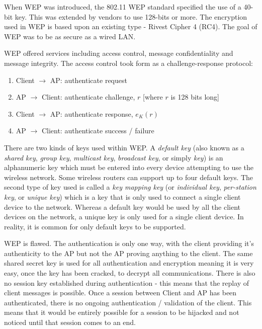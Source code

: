 When WEP was introduced, the 802.11 WEP standard specified the use of a 40-bit key. This was extended by vendors to use 128-bits or more. The encryption used in WEP is based upon an existing type - Rivest Cipher 4 (RC4). The goal of WEP was to be as secure as a wired LAN. 

WEP offered services including access control, message confidentiality and message integrity. The access control took form as a challenge-response protocol:
\begin{enumerate}
    \item Client $\rightarrow$ AP: authenticate request
    \item AP $\rightarrow$ Client: authenticate challenge, $r$ [where $r$ is 128 bits long]
    \item Client $\rightarrow$ AP: authenticate response, $e_K(r)$
    \item AP $\rightarrow$ Client: authenticate success / failure
\end{enumerate}

There are two kinds of keys used within WEP. A \textit{default key} (also known as a \textit{shared key}, \textit{group key}, \textit{multicast key}, \textit{broadcast key}, or simply \textit{key}) is an alphanumeric key which must be entered into every device attempting to use the wireless network. Some wireless routers can support up to four default keys. The second type of key used is called a \textit{key mapping key} (or \textit{individual key}, \textit{per-station key}, or \textit{unique key}) which is a key that is only used to connect a single client device to the network. Whereas a default key would be used by all the client devices on the network, a unique key is only used for a single client device. In reality, it is common for only default keys to be supported.

WEP is flawed. The authentication is only one way, with the client providing it's authenticity to the AP but not the AP proving anything to the client. The same shared secret key is used for all authentication and encryption meaning it is very easy, once the key has been cracked, to decrypt all communications. There is also no session key established during authentication - this means that the replay of client messages is possible. Once a session between Client and AP has been authenticated, there is no ongoing authentication / validation of the client. This means that it would be entirely possible for a session to be hijacked and not noticed until that session comes to an end. 

